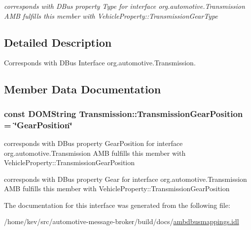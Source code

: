 \begin{DoxyCompactItemize}
\begin{DoxyCompactList}\small\item\em corresponds with D\+Bus property Type for interface org.\+automotive.\+Transmission A\+M\+B fulfills this member with Vehicle\+Property\+::\+Transmission\+Gear\+Type \end{DoxyCompactList}\end{DoxyCompactItemize}


\subsection{Detailed Description}
Corresponds with D\+Bus Interface org.\+automotive.\+Transmission. 

\subsection{Member Data Documentation}
\hypertarget{interfaceTransmission_a0271138d40b3619ffcbfe32f2081d516}{
\subsubsection[{Transmission\+Gear\+Position}]{\setlength{\rightskip}{0pt plus 5cm}const D\+O\+M\+String Transmission\+::\+Transmission\+Gear\+Position = \char`\"{}Gear\+Position\char`\"{}}}\label{interfaceTransmission_a0271138d40b3619ffcbfe32f2081d516}


corresponds with D\+Bus property Gear\+Position for interface org.\+automotive.\+Transmission A\+M\+B fulfills this member with Vehicle\+Property\+::\+Transmission\+Gear\+Position 

corresponds with D\+Bus property Gear for interface org.\+automotive.\+Transmission A\+M\+B fulfills this member with Vehicle\+Property\+::\+Transmission\+Gear\+Position 

The documentation for this interface was generated from the following file\+:\begin{DoxyCompactItemize}
\item 
/home/kev/src/automotive-\/message-\/broker/build/docs/\hyperlink{ambdbusmappings_8idl}{ambdbusmappings.\+idl}\end{DoxyCompactItemize}
